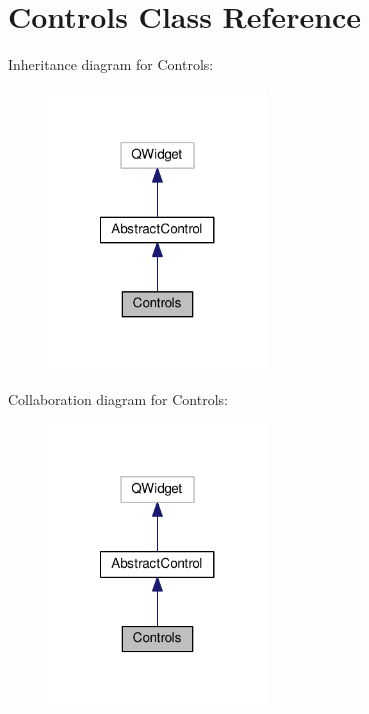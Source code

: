 \hypertarget{class_controls}{\section{Controls Class Reference}
\label{class_controls}
}


Inheritance diagram for Controls\-:
\nopagebreak
\begin{figure}[H]
\begin{center}
\leavevmode
\includegraphics[width=164pt]{class_controls__inherit__graph}
\end{center}
\end{figure}


Collaboration diagram for Controls\-:
\nopagebreak
\begin{figure}[H]
\begin{center}
\leavevmode
\includegraphics[width=164pt]{class_controls__coll__graph}
\end{center}
\end{figure}
